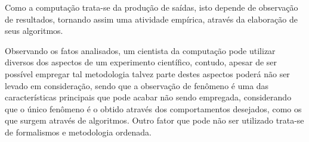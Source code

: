 Como a computação trata-se da produção de saídas, isto depende de observação de resultados, tornando assim uma atividade empírica, através da elaboração de seus algoritmos.

Observando os fatos analisados, um cientista da computação pode utilizar diversos dos aspectos de um experimento científico, contudo, apesar de ser possível empregar tal metodologia talvez parte destes aspectos poderá não ser levado em consideração, sendo que a observação de fenômeno é uma das características principais que pode acabar não sendo empregada, considerando que o único fenômeno é o obtido através dos comportamentos desejados, como os que surgem através de algoritmos. Outro fator que pode não ser utilizado trata-se de formalismos e metodologia ordenada.


